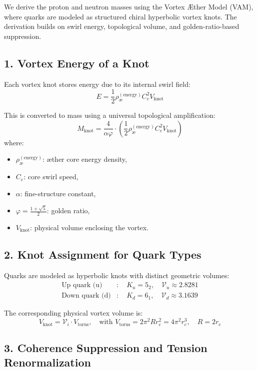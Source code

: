 \documentclass[12pt]{article}
\begin{document}
We derive the proton and neutron masses using the Vortex Æther Model (VAM), where quarks are modeled as structured chiral hyperbolic vortex knots. The derivation builds on swirl energy, topological volume, and golden-ratio-based suppression.

\subsection*{1. Vortex Energy of a Knot}

Each vortex knot stores energy due to its internal swirl field:
\[
E = \frac{1}{2} \rho_\text{\ae}^{(\text{energy})} C_e^2 V_{\text{knot}}
\]

This is converted to mass using a universal topological amplification:
\[
\boxed{
M_{\text{knot}} = \frac{4}{\alpha \varphi} \cdot \left( \frac{1}{2} \rho_\text{\ae}^{(\text{energy})} C_e^2 V_{\text{knot}} \right)
}
\]
where:
\begin{itemize}
  \item \( \rho_\text{\ae}^{(\text{energy})} \): æther core energy density,
  \item \( C_e \): core swirl speed,
  \item \( \alpha \): fine-structure constant,
  \item \( \varphi = \frac{1+\sqrt{5}}{2} \): golden ratio,
  \item \( V_{\text{knot}} \): physical volume enclosing the vortex.
\end{itemize}

\subsection*{2. Knot Assignment for Quark Types}

Quarks are modeled as hyperbolic knots with distinct geometric volumes:
\[
\begin{aligned}
\text{Up quark (u)} &: \quad K_u = 5_2, \quad \mathcal{V}_u \approx 2.8281 \\
\text{Down quark (d)} &: \quad K_d = 6_1, \quad \mathcal{V}_d \approx 3.1639
\end{aligned}
\]

The corresponding physical vortex volume is:
\[
V_{\text{knot}} = \mathcal{V}_i \cdot V_{\text{torus}}, \quad \text{with } V_{\text{torus}} = 2\pi^2 R r_c^2 = 4\pi^2 r_c^3, \quad R = 2r_c
\]

\subsection*{3. Coherence Suppression and Tension Renormalization}
\end{document}
